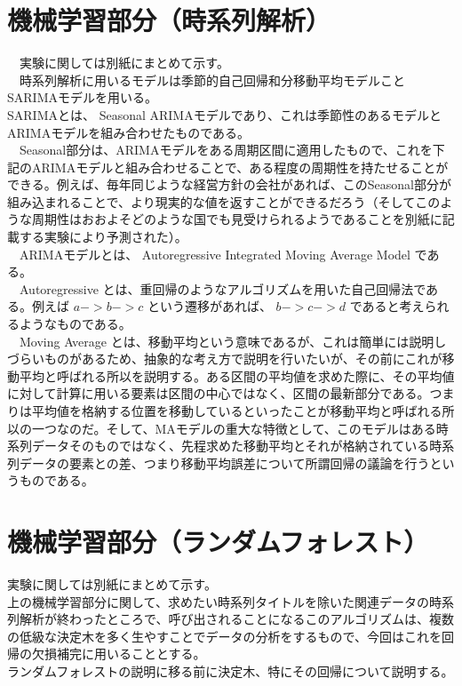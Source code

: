 \documentclass{scrartcl}
\begin{document}
\section{機械学習部分（時系列解析）}
\label{sec:orgfe2b4d1}
  　実験に関しては別紙にまとめて示す。\\
  　時系列解析に用いるモデルは季節的自己回帰和分移動平均モデルことSARIMAモデルを用いる。\\
SARIMAとは、 Seasonal ARIMAモデルであり、これは季節性のあるモデルとARIMAモデルを組み合わせたものである。\\
  　Seasonal部分は、ARIMAモデルをある周期区間に適用したもので、これを下記のARIMAモデルと組み合わせることで、ある程度の周期性を持たせることができる。例えば、毎年同じような経営方針の会社があれば、このSeasonal部分が組み込まれることで、より現実的な値を返すことができるだろう（そしてこのような周期性はおおよそどのような国でも見受けられるようであることを別紙に記載する実験により予測された）。\\
  　ARIMAモデルとは、 Autoregressive Integrated Moving Average Model である。\\
  　Autoregressive とは、重回帰のようなアルゴリズムを用いた自己回帰法である。例えば \(a->b->c\) という遷移があれば、 \(b->c->d\) であると考えられるようなものである。\\
  　Moving Average とは、移動平均という意味であるが、これは簡単には説明しづらいものがあるため、抽象的な考え方で説明を行いたいが、その前にこれが移動平均と呼ばれる所以を説明する。ある区間の平均値を求めた際に、その平均値に対して計算に用いる要素は区間の中心ではなく、区間の最新部分である。つまりは平均値を格納する位置を移動しているといったことが移動平均と呼ばれる所以の一つなのだ。そして、MAモデルの重大な特徴として、このモデルはある時系列データそのものではなく、先程求めた移動平均とそれが格納されている時系列データの要素との差、つまり移動平均誤差について所謂回帰の議論を行うというものである。\\

\section{機械学習部分（ランダムフォレスト）}
\label{sec:org058ee37}
実験に関しては別紙にまとめて示す。\\
上の機械学習部分に関して、求めたい時系列タイトルを除いた関連データの時系列解析が終わったところで、呼び出されることになるこのアルゴリズムは、複数の低級な決定木を多く生やすことでデータの分析をするもので、今回はこれを回帰の欠損補完に用いることとする。\\
ランダムフォレストの説明に移る前に決定木、特にその回帰について説明する。\\
\end{document}
